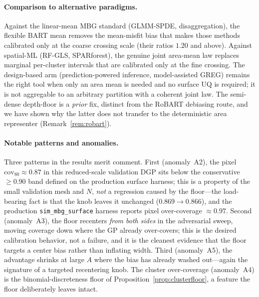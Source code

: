 \documentclass[11pt]{article}
\theoremstyle{remark}
\newcommand{\cov}{\mathrm{cov}}
\begin{document}
\paragraph{Comparison to alternative paradigms.}
Against the linear-mean MBG standard (GLMM-SPDE, disaggregation), the flexible BART
mean removes the mean-misfit bias that makes those methods calibrated only at the
coarse crossing scale (their ratios $1.20$ and above). Against spatial-ML
(RF-GLS, SPARforest), the genuine joint area-mean law replaces marginal
per-cluster intervals that are calibrated only at the fine crossing. The design-based
arm (prediction-powered inference, model-assisted GREG) remains the right tool when
only an area mean is needed and no surface UQ is required; it is not aggregable to
an arbitrary partition with a coherent joint law. The semi-dense depth-floor is a
\emph{prior} fix, distinct from the RoBART debiasing route, and we have shown why
the latter does not transfer to the deterministic area representer
(Remark~\ref{rem:robart}).

\paragraph{Notable patterns and anomalies.}
Three patterns in the results merit comment. First (anomaly~A2), the pixel
$\cov_{80}\approx0.87$ in this reduced-scale validation DGP sits below the
conservative $\ge0.90$ band defined on the production surface harness; this is a
property of the small validation mesh and $N$, \emph{not} a regression caused by
the floor---the load-bearing fact is that the knob leaves it unchanged
($0.869\to0.866$), and the production \texttt{sim\_mbg\_surface} harness reports
pixel over-coverage $\approx0.97$. Second (anomaly~A3), the floor recenters
\emph{from both sides} in the adversarial sweep, moving coverage down where the GP
already over-covers; this is the desired calibration behavior, not a failure, and
it is the cleanest evidence that the floor targets a center bias rather than
inflating width. Third (anomaly~A5), the advantage shrinks at large $A$ where the
bias has already washed out---again the signature of a targeted recentering knob.
The cluster over-coverage (anomaly~A4) is the binomial-discreteness floor of
Proposition~\ref{prop:clusterfloor}, a feature the floor deliberately leaves
intact.
\end{document}
